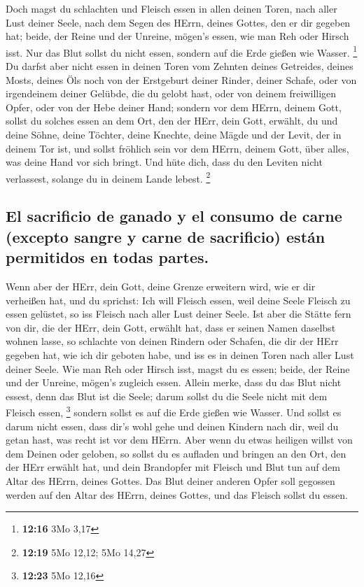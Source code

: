  Doch magst du schlachten und Fleisch essen in allen
deinen Toren, nach aller Lust deiner Seele, nach dem Segen des HErrn,
deines Gottes, den er dir gegeben hat; beide, der Reine und der Unreine,
mögen's essen, wie man Reh oder Hirsch isst.  Nur das
Blut sollst du nicht essen, sondern auf die Erde gießen wie Wasser.
\footnote{\textbf{12:16} 3Mo 3,17}  Du darfst aber nicht
essen in deinen Toren vom Zehnten deines Getreides, deines Mosts, deines
Öls noch von der Erstgeburt deiner Rinder, deiner Schafe, oder von
irgendeinem deiner Gelübde, die du gelobt hast, oder von deinem
freiwilligen Opfer, oder von der Hebe deiner Hand; 
sondern vor dem HErrn, deinem Gott, sollst du solches essen an dem Ort,
den der HErr, dein Gott, erwählt, du und deine Söhne, deine Töchter,
deine Knechte, deine Mägde und der Levit, der in deinem Tor ist, und
sollst fröhlich sein vor dem HErrn, deinem Gott, über alles, was deine
Hand vor sich bringt.  Und hüte dich, dass du den Leviten
nicht verlassest, solange du in deinem Lande lebest. \footnote{\textbf{12:19}
  5Mo 12,12; 5Mo 14,27}

\hypertarget{el-sacrificio-de-ganado-y-el-consumo-de-carne-excepto-sangre-y-carne-de-sacrificio-estuxe1n-permitidos-en-todas-partes.}{%
\subsection{El sacrificio de ganado y el consumo de carne (excepto
sangre y carne de sacrificio) están permitidos en todas
partes.}\label{el-sacrificio-de-ganado-y-el-consumo-de-carne-excepto-sangre-y-carne-de-sacrificio-estuxe1n-permitidos-en-todas-partes.}}

 Wenn aber der HErr, dein Gott, deine Grenze erweitern
wird, wie er dir verheißen hat, und du sprichst: Ich will Fleisch essen,
weil deine Seele Fleisch zu essen gelüstet, so iss Fleisch nach aller
Lust deiner Seele.  Ist aber die Stätte fern von dir, die
der HErr, dein Gott, erwählt hat, dass er seinen Namen daselbst wohnen
lasse, so schlachte von deinen Rindern oder Schafen, die dir der HErr
gegeben hat, wie ich dir geboten habe, und iss es in deinen Toren nach
aller Lust deiner Seele.  Wie man Reh oder Hirsch isst,
magst du es essen; beide, der Reine und der Unreine, mögen's zugleich
essen.  Allein merke, dass du das Blut nicht essest, denn
das Blut ist die Seele; darum sollst du die Seele nicht mit dem Fleisch
essen, \footnote{\textbf{12:23} 5Mo 12,16}  sondern
sollst es auf die Erde gießen wie Wasser.  Und sollst es
darum nicht essen, dass dir's wohl gehe und deinen Kindern nach dir,
weil du getan hast, was recht ist vor dem HErrn.  Aber
wenn du etwas heiligen willst von dem Deinen oder geloben, so sollst du
es aufladen und bringen an den Ort, den der HErr erwählt hat,
 und dein Brandopfer mit Fleisch und Blut tun auf dem
Altar des HErrn, deines Gottes. Das Blut deiner anderen Opfer soll
gegossen werden auf den Altar des HErrn, deines Gottes, und das Fleisch
sollst du essen.

